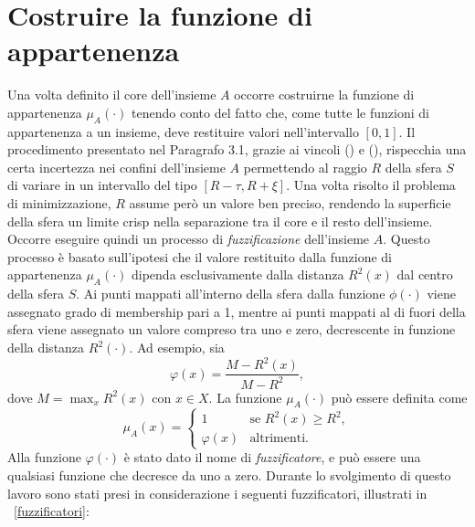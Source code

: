 \documentclass [11pt,a4paper,twoside,openright] {book}
\begin{document}
\section{Costruire la funzione di appartenenza}
Una volta definito il core dell'insieme $A$ occorre costruirne la funzione di appartenenza $\mu_A(\cdot)$ tenendo conto del fatto che, come tutte le funzioni di appartenenza a un insieme, deve restituire valori nell'intervallo $[0, 1]$. Il procedimento presentato nel Paragrafo 3.1, grazie ai vincoli () e (), rispecchia una certa incertezza nei confini dell'insieme $A$ permettendo al raggio $R$ della sfera $S$ di variare in un intervallo del tipo $[R - \tau , R + \xi]$. Una volta risolto il problema di minimizzazione, $R$ assume però un valore ben preciso, rendendo la superficie della sfera un limite crisp nella separazione tra il core e il resto dell'insieme. Occorre eseguire quindi un processo di \textit{fuzzificazione} dell'insieme $A$. Questo processo è basato sull'ipotesi che il valore restituito dalla funzione di appartenenza $\mu_A(\cdot)$ dipenda esclusivamente dalla distanza $R^2(x)$ dal centro della sfera $S$. Ai punti mappati all'interno della sfera dalla funzione $\phi(\cdot)$ viene assegnato grado di membership pari a 1, mentre ai punti mappati al di fuori della sfera viene assegnato un valore compreso tra uno e zero, decrescente in funzione della distanza $R^2(\cdot)$. Ad esempio, sia 
\begin{equation}
\varphi(x) = \dfrac{M-R^2(x)}{M-R^2},
\end{equation}
dove $M= \max_x R^2(x)$ con $x \in X$. La funzione $\mu_A(\cdot)$ può essere definita come
\begin{equation}\label{fuzzyeq}
\mu_A(x)=
\begin{cases}
1 & \text{se } R^2(x) \geq R^2, \\
\varphi(x)& \text{altrimenti}.
\end{cases}
\end{equation}
Alla funzione $\varphi(\cdot)$ è stato dato il nome di \textit{fuzzificatore}, e può essere una qualsiasi funzione che decresce da uno a zero. Durante lo svolgimento di questo lavoro sono stati presi in considerazione i seguenti fuzzificatori, illustrati in \figurename~\ref{fuzzificatori}:
\end{document}
